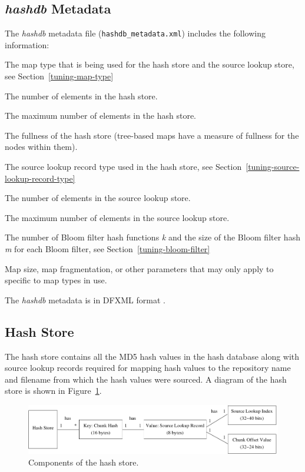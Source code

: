 \documentclass[12pt,twoside]{article}
\newcommand{\hdb}{\emph{hashdb}\xspace}
\begin{document}
\subsection{\hdb Metadata\label{hashdb-metadata}}
The \hdb metadata file (\texttt{hashdb\_metadata.xml}) includes the following information:
\begin{compactitem}
\item The map type that is being used for the hash store and the source lookup store,
      see Section~\ref{tuning-map-type}
\item The number of elements in the hash store.
\item The maximum number of elements in the hash store.
\item The fullness of the hash store (tree-based maps
have a measure of fullness for the nodes within them).
\item The source lookup record type used in the hash store,
see Section~\ref{tuning-source-lookup-record-type}
\item The number of elements in the source lookup store.
\item The maximum number of elements in the source lookup store.
\item The number of Bloom filter hash functions \emph{k}
and the size of the Bloom filter hash \emph{m} for each Bloom filter,
see Section~\ref{tuning-bloom-filter}
\item Map size, map fragmentation, or other parameters
that may only apply to specific to map types in use.
\end{compactitem}
The \hdb metadata is in DFXML format \cite{dfxml}.

\subsection{Hash Store}
The hash store contains all the MD5 hash values in the hash database
along with source lookup records required for mapping hash values
to the repository name and filename from which the hash values were sourced.
A diagram of the hash store is shown in Figure~\ref{fig-hash-store}.

\begin{figure}[h]
  \center
  \includegraphics{drawings/hash_store}
  \caption{Components of the hash store.\label{fig-hash-store}}
\end{figure}
\end{document}
